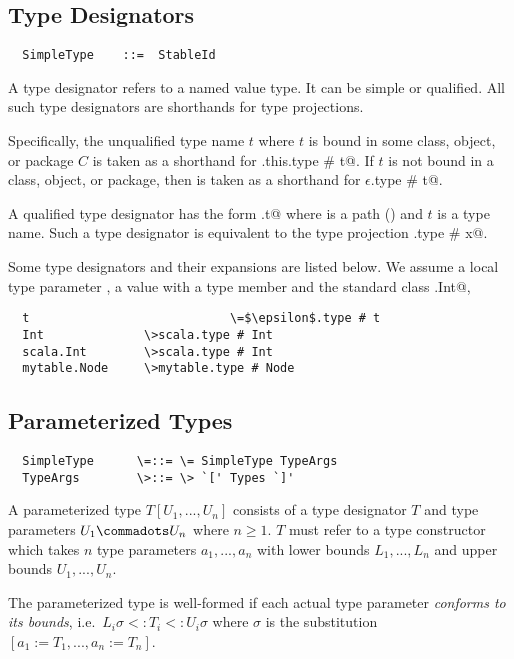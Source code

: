 \documentclass[11pt]{report}
\begin{document}
\subsection{Type Designators}
\label{sec:type-desig}

\syntax\begin{verbatim}
  SimpleType   	::=  StableId
\end{verbatim}

A type designator refers to a named value type. It can be simple or
qualified. All such type designators are shorthands for type projections.

Specifically, the unqualified type name $t$ where $t$ is bound in some
class, object, or package $C$ is taken as a shorthand for
\verb@C.this.type # t@.  If $t$ is not bound in a class, object, or
package, then \verb@t@ is taken as a shorthand for
\verb@$\epsilon$.type # t@.

A qualified type designator has the form \verb@p.t@ where \verb@p@ is
a path (\sref{}) and $t$ is a type name. Such a type designator is
equivalent to the type projection \verb@p.type # x@.

\example 
Some type designators and their expansions are listed below. We assume
a local type parameter \verb@t@, a value \verb@mytable@
with a type member \verb@Node@ and the standard class \verb@scala.Int@, 
\begin{verbatim}
  t                            \=$\epsilon$.type # t
  Int              \>scala.type # Int
  scala.Int        \>scala.type # Int
  mytable.Node     \>mytable.type # Node
\end{verbatim}

\subsection{Parameterized Types}
\label{sec:param-types}

\syntax\begin{verbatim}
  SimpleType      \=::= \= SimpleType TypeArgs
  TypeArgs        \>::= \> `[' Types `]'
\end{verbatim}

A parameterized type $T[U_1, ..., U_n]$ consists of a type designator
$T$ and type parameters $U_1 \commadots U_n$ where $n \geq 1$.  $T$
must refer to a type constructor which takes $n$ type parameters $a_1,
..., a_n$ with lower bounds $L_1, ..., L_n$ and upper bounds $U_1,
..., U_n$.

The parameterized type is well-formed if each actual type parameter
{\em conforms to its bounds}, i.e.\ $L_i\sigma <: T_i <: U_i\sigma$ where $\sigma$
is the substitution $[a_1 := T_1, ..., a_n := T_n]$.
\end{document}
